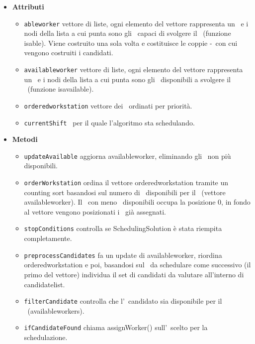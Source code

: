 \begin{itemize}
    \item \textbf{Attributi}
    \begin{itemize}
        \item \texttt{able\textunderscore worker} vettore di liste, ogni elemento del vettore rappresenta un \task\ e i nodi della lista a cui punta sono gli \items\ capaci di svolgere il \task\ (funzione is\textunderscore able). Viene costruito una sola volta e costituisce le coppie \items -\task\ con cui vengono costruiti i candidati.
        \item \texttt{available\textunderscore worker} vettore di liste, ogni elemento del vettore rappresenta un \task\ e i nodi della lista a cui punta sono gli \items\ disponibili a svolgere il \task\ (funzione is\textunderscore available).
        \item \texttt{ordered\textunderscore workstation} vettore dei \task\ ordinati per priorità.
        \item \texttt{currentShift} \ttb\ per il quale l'algoritmo sta schedulando.
    \end{itemize}
    \item \textbf{Metodi}
    \begin{itemize}
        \item \texttt{updateAvailable} aggiorna available\textunderscore worker, eliminando gli \items\ non più disponibili.
        \item \texttt{orderWorkstation} ordina il vettore ordered\textunderscore workstation tramite un counting sort basandosi sul numero di \items\ disponibili per il \task\ (vettore available\textunderscore worker). Il \task\ con meno \items\ disponibili occupa la posizione 0, in fondo al vettore vengono posizionati i \task\ già assegnati.
        \item \texttt{stopConditions} controlla se SchedulingSolution è stata riempita completamente.
        \item \texttt{preprocessCandidates} fa un update di available\textunderscore worker, riordina ordered\textunderscore workstation e poi, basandosi sul \task\ da schedulare come successivo (il primo del vettore) individua il set di candidati da valutare all'interno di candidate\textunderscore list.
        \item \texttt{filterCandidate} controlla che l'\items\ candidato sia disponibile per il \task\ (available\textunderscore workers).
        \item \texttt{ifCandidateFound} chiama assignWorker() sull'\items\ scelto per la schedulazione.
    \end{itemize}
\end{itemize}
